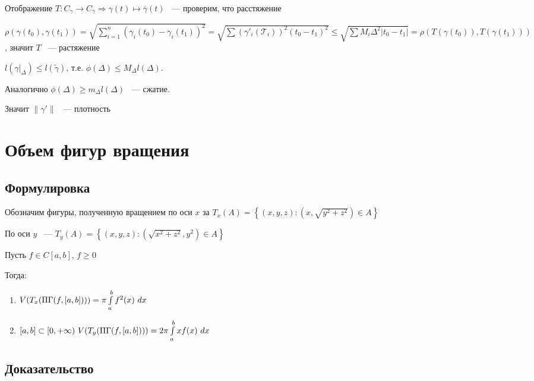 \documentclass{article}
\begin{document}
            Отображение $T : C_{\gamma} \rightarrow C_{\overline{\gamma}} \Longrightarrow \gamma(t) \mapsto \overline{\gamma}(t)$ ~--- проверим, что расстяжение
            
            $\rho(\gamma(t_0), \gamma(t_1)) = \sqrt{\sum\limits_{i = 1}^n (\gamma_i(t_0) - \gamma_i(t_1))^2} = \sqrt{\sum(\gamma'_i(\mathcal{T}_i))^2(t_0 - t_1)^2} \leq \sqrt{\sum M_i{\Delta}^2 |t_0 - t_1|} = \rho(T(\gamma(t_0)), T(\gamma(t_1)))$, значит $T$ ~--- растяжение
            
            $l\left( \gamma|_{\Delta} \right) \leq l(\widetilde{\gamma})$, т.е. $\phi(\Delta) \leq M_{\Delta} l(\Delta)$.
            
            Аналогично $\phi(\Delta) \geq m_{\Delta}l(\Delta)$ ~--- сжатие.
            
            Значит $\| \gamma' \|$ ~--- плотность
            
    \newpage
    
    \section{Объем фигур вращения}
    
        \subsection{Формулировка}
            Обозначим фигуры, полученную вращением по оси $x$ за $T_x(A) = \left\{ (x, y, z) : (x, \sqrt{y^2 + z^2}) \in A \right\}$
        
            По оси $y$ ~--- $T_y(A) = \left\{ (x, y, z) : (\sqrt{x^2 + z^2}, y^2) \in A \right\}$
        
            Пусть $f \in C[a, b]$, $f \geq 0$
            
            Тогда:
            
            \begin{enumerate}
            
                \item $V(T_x(\Pi\Gamma(f, [a, b]))) = \pi \int\limits^b_a f^2(x) \ dx$
                
                \item $[a, b] \subset [0, +\infty) \ V(T_y(\PG(f, [a, b]))) = 2 \pi \int\limits^b_a x f(x) \ dx$
                
            \end{enumerate}
            
        \subsection{Доказательство}
        
\end{document}
